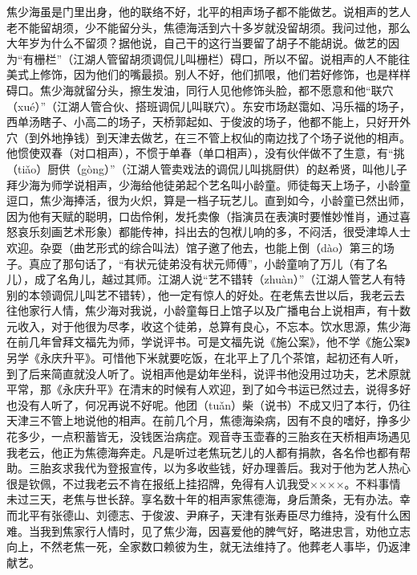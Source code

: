\documentclass[12pt,UTF8]{ctexbook}
\begin{document}
焦少海虽是门里出身，他的联络不好，北平的相声场子都不能做艺。说相声的艺人老不能留胡须，少不能留分头，焦德海活到六十多岁就没留胡须。我问过他，那么大年岁为什么不留须？据他说，自己干的这行当要留了胡子不能胡说。做艺的因为“有栅栏”（江湖人管留胡须调侃儿叫栅栏）碍口，所以不留。说相声的人不能往美式上修饰，因为他们的嘴最损。别人不好，他们抓哏，他们若好修饰，也是样样碍口。焦少海就留分头，擦生发油，同行人见他修饰头脸，都不愿意和他“联穴（xué）”（江湖人管合伙、搭班调侃儿叫联穴）。东安市场赵霭如、冯乐福的场子，西单汤瞎子、小高二的场子，天桥郭起如、于俊波的场子，他都不能上，只好开外穴（到外地挣钱）到天津去做艺，在三不管上权仙的南边找了个场子说他的相声。他惯使双春（对口相声），不惯于单春（单口相声），没有伙伴做不了生意，有“挑（tiǎo）厨供（gòng）”（江湖人管卖戏法的调侃儿叫挑厨供）的赵希贤，叫他儿子拜少海为师学说相声，少海给他徒弟起个艺名叫小龄童。师徒每天上场子，小龄童逗口，焦少海捧活，很为火炽，算是一档子玩艺儿。直到如今，小龄童已然出师，因为他有天赋的聪明，口齿伶俐，发托卖像（指演员在表演时要惟妙惟肖，通过喜怒哀乐刻画艺术形象）都能传神，抖出去的包袱儿响的多，不闷活，很受津埠人士欢迎。杂耍（曲艺形式的综合叫法）馆子邀了他去，也能上倒（dào）第三的场子。真应了那句话了，“有状元徒弟没有状元师傅”，小龄童响了万儿（有了名儿），成了名角儿，越过其师。江湖人说“艺不错转（zhuàn）”（江湖人管艺人有特别的本领调侃儿叫艺不错转），他一定有惊人的好处。在老焦去世以后，我老云去往他家行人情，焦少海对我说，小龄童每日上馆子以及广播电台上说相声，有十数元收入，对于他很为尽孝，收这个徒弟，总算有良心，不忘本。饮水思源，焦少海在前几年曾拜文福先为师，学说评书。可是文福先说《施公案》，他不学《施公案》另学《永庆升平》。可惜他下米就要吃饭，在北平上了几个茶馆，起初还有人听，到了后来简直就没人听了。说相声他是幼年坐科，说评书他没用过功夫，艺术原就平常，那《永庆升平》在清末的时候有人欢迎，到了如今书运已然过去，说得多好也没有人听了，何况再说不好呢。他团（tuǎn）柴（说书）不成又归了本行，仍往天津三不管上地说他的相声。在前几个月，焦德海染病，因有不良的嗜好，挣多少花多少，一点积蓄皆无，没钱医治病症。观音寺玉壶春的三胎亥在天桥相声场遇见我老云，他正为焦德海奔走。凡是听过老焦玩艺儿的人都有捐款，各名伶也都有帮助。三胎亥求我代为登报宣传，以为多收些钱，好办理善后。我对于他为艺人热心很是钦佩，不过我老云不肯在报纸上挂招牌，免得有人讥我受××××。不料事情未过三天，老焦与世长辞。享名数十年的相声家焦德海，身后萧条，无有办法。幸而北平有张德山、刘德志、于俊波、尹麻子，天津有张寿臣尽力维持，没有什么困难。当我到焦家行人情时，见了焦少海，因喜爱他的脾气好，略进忠言，劝他立志向上，不然老焦一死，全家数口赖彼为生，就无法维持了。他葬老人事毕，仍返津献艺。
\end{document}
